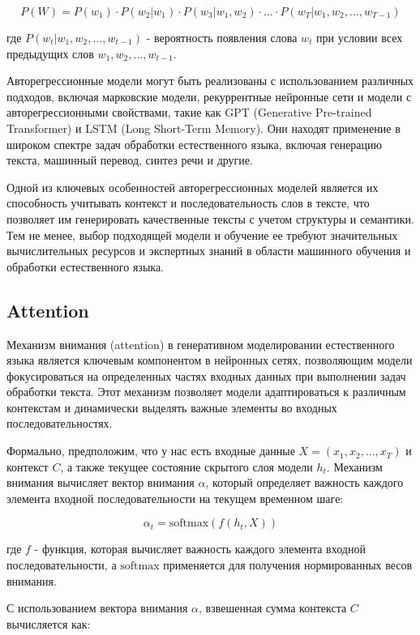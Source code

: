 \[ P(W) = P(w_1) \cdot P(w_2|w_1) \cdot P(w_3|w_1, w_2) \cdot \ldots \cdot P(w_T|w_1, w_2, ..., w_{T-1}) \]

где \( P(w_t|w_1, w_2, ..., w_{t-1}) \) - вероятность появления слова \( w_t \) при условии всех предыдущих слов \( w_1, w_2, ..., w_{t-1} \).

Авторегрессионные модели могут быть реализованы с использованием различных подходов, включая марковские модели, рекуррентные нейронные сети и модели с авторегрессионными свойствами, такие как GPT (Generative Pre-trained Transformer) и LSTM (Long Short-Term Memory). Они находят применение в широком спектре задач обработки естественного языка, включая генерацию текста, машинный перевод, синтез речи и другие.

Одной из ключевых особенностей авторегрессионных моделей является их способность учитывать контекст и последовательность слов в тексте, что позволяет им генерировать качественные тексты с учетом структуры и семантики. Тем не менее, выбор подходящей модели и обучение ее требуют значительных вычислительных ресурсов и экспертных знаний в области машинного обучения и обработки естественного языка.

\subsection{Attention}

Механизм внимания (attention) в генеративном моделировании естественного языка является ключевым компонентом в нейронных сетях, позволяющим модели фокусироваться на определенных частях входных данных при выполнении задач обработки текста. Этот механизм позволяет модели адаптироваться к различным контекстам и динамически выделять важные элементы во входных последовательностях.

Формально, предположим, что у нас есть входные данные \( X = (x_1, x_2, ..., x_T) \) и контекст \( C \), а также текущее состояние скрытого слоя модели \( h_t \). Механизм внимания вычисляет вектор внимания \( \alpha \), который определяет важность каждого элемента входной последовательности на текущем временном шаге:

\[ \alpha_t = \text{softmax}(f(h_t, X)) \]

где \( f \) - функция, которая вычисляет важность каждого элемента входной последовательности, а \( \text{softmax} \) применяется для получения нормированных весов внимания.

С использованием вектора внимания \( \alpha \), взвешенная сумма контекста \( C \) вычисляется как:

